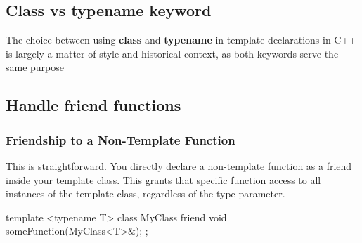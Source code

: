\documentclass{report}
\begin{document}
    \bigbreak \noindent 
    \subsection{Class vs typename keyword}
    \bigbreak \noindent 
    The choice between using \textbf{class} and \textbf{typename} in template declarations in C++ is largely a matter of style and historical context, as both keywords serve the same purpose

    \bigbreak \noindent 
    \subsection{Handle friend functions}
    \bigbreak \noindent 

    \subsubsection{Friendship to a Non-Template Function}
    \bigbreak \noindent 
    This is straightforward. You directly declare a non-template function as a friend inside your template class. This grants that specific function access to all instances of the template class, regardless of the type parameter.
    \bigbreak \noindent 
    \begin{cppcode}
        template <typename T>
        class MyClass {
            friend void someFunction(MyClass<T>&);
        };
    \end{cppcode}
    \bigbreak \noindent 
\end{document}
